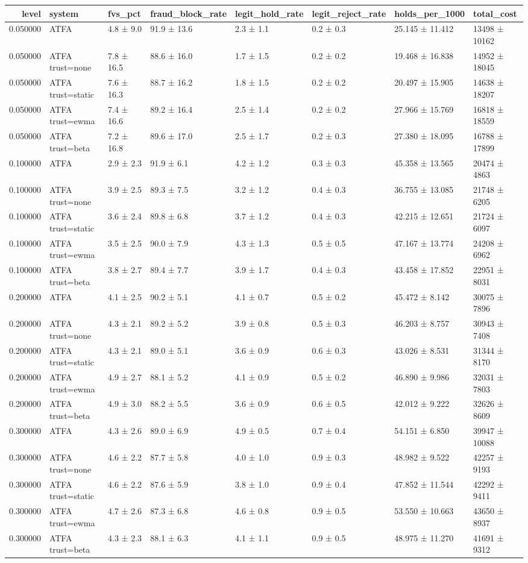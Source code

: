 \begin{tabular}{rlllllll}
\toprule
level & system & fvs\_pct & fraud\_block\_rate & legit\_hold\_rate & legit\_reject\_rate & holds\_per\_1000 & total\_cost \\
\midrule
0.050000 & ATFA & 4.8 ± 9.0 & 91.9 ± 13.6 & 2.3 ± 1.1 & 0.2 ± 0.3 & 25.145 ± 11.412 & 13498 ± 10162 \\
0.050000 & ATFA trust=none & 7.8 ± 16.5 & 88.6 ± 16.0 & 1.7 ± 1.5 & 0.2 ± 0.2 & 19.468 ± 16.838 & 14952 ± 18045 \\
0.050000 & ATFA trust=static & 7.6 ± 16.3 & 88.7 ± 16.2 & 1.8 ± 1.5 & 0.2 ± 0.2 & 20.497 ± 15.905 & 14638 ± 18207 \\
0.050000 & ATFA trust=ewma & 7.4 ± 16.6 & 89.2 ± 16.4 & 2.5 ± 1.4 & 0.2 ± 0.2 & 27.966 ± 15.769 & 16818 ± 18559 \\
0.050000 & ATFA trust=beta & 7.2 ± 16.8 & 89.6 ± 17.0 & 2.5 ± 1.7 & 0.2 ± 0.3 & 27.380 ± 18.095 & 16788 ± 17899 \\
0.100000 & ATFA & 2.9 ± 2.3 & 91.9 ± 6.1 & 4.2 ± 1.2 & 0.3 ± 0.3 & 45.358 ± 13.565 & 20474 ± 4863 \\
0.100000 & ATFA trust=none & 3.9 ± 2.5 & 89.3 ± 7.5 & 3.2 ± 1.2 & 0.4 ± 0.3 & 36.755 ± 13.085 & 21748 ± 6205 \\
0.100000 & ATFA trust=static & 3.6 ± 2.4 & 89.8 ± 6.8 & 3.7 ± 1.2 & 0.4 ± 0.3 & 42.215 ± 12.651 & 21724 ± 6097 \\
0.100000 & ATFA trust=ewma & 3.5 ± 2.5 & 90.0 ± 7.9 & 4.3 ± 1.3 & 0.5 ± 0.5 & 47.167 ± 13.774 & 24208 ± 6962 \\
0.100000 & ATFA trust=beta & 3.8 ± 2.7 & 89.4 ± 7.7 & 3.9 ± 1.7 & 0.4 ± 0.3 & 43.458 ± 17.852 & 22951 ± 8031 \\
0.200000 & ATFA & 4.1 ± 2.5 & 90.2 ± 5.1 & 4.1 ± 0.7 & 0.5 ± 0.2 & 45.472 ± 8.142 & 30075 ± 7896 \\
0.200000 & ATFA trust=none & 4.3 ± 2.1 & 89.2 ± 5.2 & 3.9 ± 0.8 & 0.5 ± 0.3 & 46.203 ± 8.757 & 30943 ± 7408 \\
0.200000 & ATFA trust=static & 4.3 ± 2.1 & 89.0 ± 5.1 & 3.6 ± 0.9 & 0.6 ± 0.3 & 43.026 ± 8.531 & 31344 ± 8170 \\
0.200000 & ATFA trust=ewma & 4.9 ± 2.7 & 88.1 ± 5.2 & 4.1 ± 0.9 & 0.5 ± 0.2 & 46.890 ± 9.986 & 32031 ± 7803 \\
0.200000 & ATFA trust=beta & 4.9 ± 3.0 & 88.2 ± 5.5 & 3.6 ± 0.9 & 0.6 ± 0.5 & 42.012 ± 9.222 & 32626 ± 8609 \\
0.300000 & ATFA & 4.3 ± 2.6 & 89.0 ± 6.9 & 4.9 ± 0.5 & 0.7 ± 0.4 & 54.151 ± 6.850 & 39947 ± 10088 \\
0.300000 & ATFA trust=none & 4.6 ± 2.2 & 87.7 ± 5.8 & 4.0 ± 1.0 & 0.9 ± 0.3 & 48.982 ± 9.522 & 42257 ± 9193 \\
0.300000 & ATFA trust=static & 4.6 ± 2.2 & 87.6 ± 5.9 & 3.8 ± 1.0 & 0.9 ± 0.4 & 47.852 ± 11.544 & 42292 ± 9411 \\
0.300000 & ATFA trust=ewma & 4.7 ± 2.6 & 87.3 ± 6.8 & 4.6 ± 0.8 & 0.9 ± 0.5 & 53.550 ± 10.663 & 43650 ± 8937 \\
0.300000 & ATFA trust=beta & 4.3 ± 2.3 & 88.1 ± 6.3 & 4.1 ± 1.1 & 0.9 ± 0.5 & 48.975 ± 11.270 & 41691 ± 9312 \\
\bottomrule
\end{tabular}
